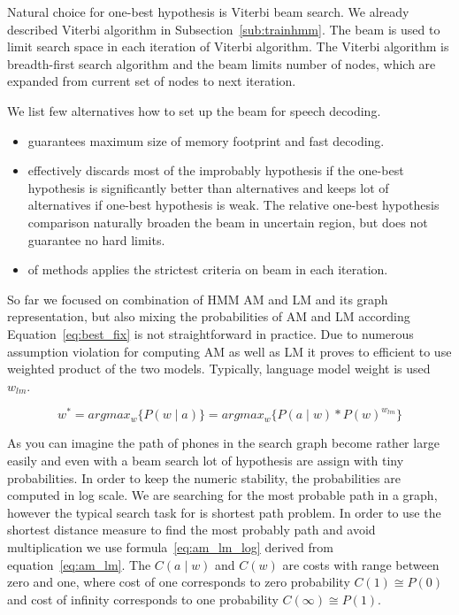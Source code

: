 {Natural choice for one-best hypothesis is Viterbi beam search\cite{huang2001spoken}.
We already described Viterbi algorithm in Subsection~\ref{sub:trainhmm}.
The beam is used to limit search space in each iteration of Viterbi algorithm.
The Viterbi algorithm is breadth-first search algorithm and the beam limits number of nodes, which are expanded from current set of nodes to next iteration.


We list few alternatives how to set up the beam for speech decoding.
\begin{itemize}
    \item {} guarantees maximum size of memory footprint and fast decoding.
    \item {} effectively discards most of the improbably hypothesis if the one-best hypothesis is significantly better than alternatives and keeps lot of alternatives if one-best hypothesis is weak.
        The relative one-best hypothesis comparison naturally broaden the beam in uncertain region, but does not guarantee no hard limits.
    \item {} of methods applies the strictest criteria on beam in each iteration.
\end{itemize}


So far we focused on combination of \ac{HMM} \ac{AM} and \ac{LM} and its graph representation, but also mixing the probabilities of \ac{AM} and \ac{LM} according Equation~\ref{eq:best_fix} is not straightforward in practice. 
Due to numerous assumption violation for computing \ac{AM} as well as \ac{LM} it proves to efficient to use weighted product of the two models.
Typically, language model weight is used $w_{lm}$.

\begin{equation}\label{eq:am_lm}
    w^* = argmax_{w}\{P(w \mid a)\} = argmax_{w}\{P(a \mid w) * P(w)^{w_{lm}}\}
\end{equation}

As you can imagine the path of phones in the search graph become rather large easily and even with a beam search lot of hypothesis are assign with tiny probabilities.
In order to keep the numeric stability, the probabilities are computed in log scale. We are searching for the most probable path in a graph, however the typical search task for is shortest path problem.
In order to use the shortest distance measure to find the most probably path and avoid multiplication we use formula~\ref{eq:am_lm_log} derived from equation~\ref{eq:am_lm}.
The $C(a \mid w)$ and $C(w)$ are costs with range between zero and one, where cost of one corresponds to zero probability $C(1) \cong P(0)$ and cost of infinity corresponds to one probability $C(\infty) \cong P(1)$.

}
